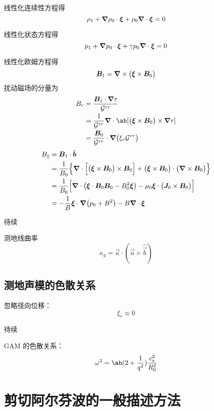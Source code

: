 线性化连续性方程得
\begin{equation}
\rho_1 + \bm{\nabla}{\rho_0} \cdot \bm{\xi} + \rho_0 \bm{\nabla} \cdot{\bm{\xi}} = 0
\end{equation}

线性化状态方程得
\begin{equation}
p_1 + \bm{\nabla}{p_0} \cdot \bm{\xi} + \gamma p_0 \bm{\nabla} \cdot{\bm{\xi}} = 0
\end{equation}

线性化欧姆方程得
\begin{equation}
\bm{B}_1 = \bm{\nabla} \times{\big( \bm{\xi} \times \bm{B}_0 \big)}
\end{equation}
扰动磁场的分量为
\begin{equation}\begin{aligned}
B_r &= \frac{\vec{B}_1 \cdot \grad{r}}{\Metric^{rr}} \\
&= \frac{1}{\Metric^{rr}} \dive{\ab[ \big(\vec{\xi} \times \vec{B}_0 \big) \times \grad{r} ]} \\
&= \frac{\vec{B}_0}{\Metric^{rr}} \cdot \grad{\big( \xi_r \Metric^{rr} \big)}
\end{aligned}\end{equation}
\begin{equation}\begin{aligned}
B_\parallel &= \bm{B}_1 \cdot \hat{\bm{b}} \\
&= \frac{1}{B_0} \Big\{
\bm{\nabla} \cdot{\Big[ \big(\bm{\xi} \times \bm{B}_0 \big) \times \bm{B}_0 \Big]}
+ \big(\bm{\xi} \times \bm{B}_0 \big) \cdot \big(\bm{\nabla} \times{\bm{B}_0} \big)
\Big\} \\
&= \frac{1}{B_0} \Big[
\bm{\nabla} \cdot{\big( \bm{\xi} \cdot \bm{B}_0 \bm{B}_0 - B_0^2 \bm{\xi} \big)}
- \mu_0 \bm{\xi} \cdot \big( \bm{J}_0 \times \bm{B}_0 \big)
\Big] \\
&= - \frac{1}{B} \bm{\xi} \cdot \bm{\nabla}{\big(p_0 + B^2 \big)} - B \bm{\nabla} \cdot{\bm{\xi}}
\end{aligned}\end{equation}

待续

测地线曲率
\begin{equation}
    \kappa_g = \vec{\kappa} \cdot (\vec{n} \times \hat{\vec{b}} )
\end{equation}

\subsection{测地声模的色散关系}

忽略径向位移：
\begin{equation}
\xi_r \approx 0
\end{equation}

待续

GAM 的色散关系：
\begin{equation}
\omega^2 = \ab( 2 + \frac{1}{q^2} ) \frac{c_s^2}{R_0^2}
\end{equation}

\section{剪切阿尔芬波的一般描述方法}
